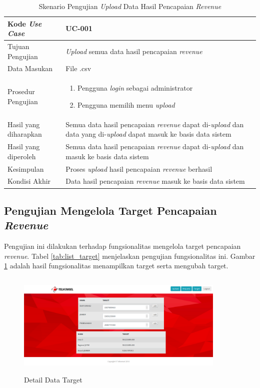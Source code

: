 \begin{table}[h!]
	\centering
	\begin{tabular}{|p{4cm}|p{6cm}|}
	\hline
	Kode \textit{Use Case} & UC-001\\ \hline
	Tujuan Pengujian & \textit{Upload} semua data hasil pencapaian \textit{revenue}\\ \hline
	Data Masukan & File .csv \\ \hline
	Prosedur Pengujian & 
		\begin{enumerate}
		\item Pengguna \textit{login} sebagai administrator
		\item Pengguna memilih menu \textit{upload}
		\end{enumerate}\\ \hline
	Hasil yang diharapkan & Semua data hasil pencapaian \textit{revenue} dapat di-\textit{upload} dan data yang di-\textit{upload} dapat masuk ke basis data sistem \\ \hline
	Hasil yang diperoleh & Semua data hasil pencapaian \textit{revenue} dapat di-\textit{upload} dan masuk ke basis data sistem \\ \hline
	Kesimpulan & Proses \textit{upload} hasil pencapaian \textit{revenue} berhasil \\ \hline
	Kondisi Akhir & Data hasil pencapaian \textit{revenue} masuk ke basis data sistem\\ \hline
	\end{tabular}\caption{Skenario Pengujian \textit{Upload} Data Hasil Pencapaian \textit{Revenue}}
	\label{tab:list_upload}
\end{table}

\subsection{Pengujian Mengelola Target Pencapaian \textit{Revenue}}
Pengujian ini dilakukan terhadap fungsionalitas mengelola target pencapaian \textit{revenue}. Tabel \ref{tab:list_target} menjelaskan pengujian fungsionalitas ini. Gambar \ref{figure:lihatTarget} adalah hasil fungsionalitas menampilkan target serta mengubah target.

\begin{figure}[h!]
\centerline
{\includegraphics[width=10cm,height=5cm]{bab6/halamanTarget.png}}
\caption{Detail Data Target}
\label{figure:lihatTarget}
\end{figure}


